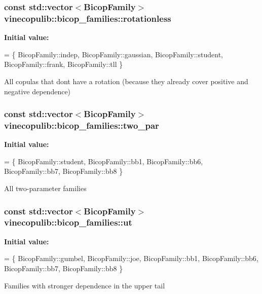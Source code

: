 \subsubsection[{\texorpdfstring{rotationless}{rotationless}}]{\setlength{\rightskip}{0pt plus 5cm}const std\+::vector$<${\bf Bicop\+Family}$>$ vinecopulib\+::bicop\+\_\+families\+::rotationless}\hypertarget{namespacevinecopulib_1_1bicop__families_ac221bc84c32d2836692ed40d89439928}{}\label{namespacevinecopulib_1_1bicop__families_ac221bc84c32d2836692ed40d89439928}
{\bfseries Initial value\+:}
\begin{DoxyCode}
= \{
    BicopFamily::indep,
    BicopFamily::gaussian,
    BicopFamily::student,
    BicopFamily::frank,
    BicopFamily::tll
\}
\end{DoxyCode}
All copulas that don\textquotesingle{}t have a rotation (because they already cover positive and negative dependence) 
\subsubsection[{\texorpdfstring{two\+\_\+par}{two_par}}]{\setlength{\rightskip}{0pt plus 5cm}const std\+::vector$<${\bf Bicop\+Family}$>$ vinecopulib\+::bicop\+\_\+families\+::two\+\_\+par}\hypertarget{namespacevinecopulib_1_1bicop__families_ad5871c39b4ee62bd44fa851d7d70c7ca}{}\label{namespacevinecopulib_1_1bicop__families_ad5871c39b4ee62bd44fa851d7d70c7ca}
{\bfseries Initial value\+:}
\begin{DoxyCode}
= \{
    BicopFamily::student,
    BicopFamily::bb1,
    BicopFamily::bb6,
    BicopFamily::bb7,
    BicopFamily::bb8
\}
\end{DoxyCode}
All two-\/parameter families 
\subsubsection[{\texorpdfstring{ut}{ut}}]{\setlength{\rightskip}{0pt plus 5cm}const std\+::vector$<${\bf Bicop\+Family}$>$ vinecopulib\+::bicop\+\_\+families\+::ut}\hypertarget{namespacevinecopulib_1_1bicop__families_af754a2d2697709c204dda0473215f9cd}{}\label{namespacevinecopulib_1_1bicop__families_af754a2d2697709c204dda0473215f9cd}
{\bfseries Initial value\+:}
\begin{DoxyCode}
= \{
    BicopFamily::gumbel,
    BicopFamily::joe,
    BicopFamily::bb1,
    BicopFamily::bb6,
    BicopFamily::bb7,
    BicopFamily::bb8
\}
\end{DoxyCode}
Families with stronger dependence in the upper tail 